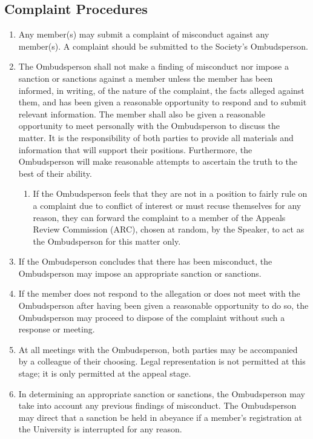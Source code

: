 \subsection{Complaint Procedures}
\begin{enumerate} [align=left]
\item Any member(s) may submit a complaint of misconduct against any member(s). A complaint should be submitted to the Society's Ombudsperson.
\item The Ombudsperson shall not make a finding of misconduct nor impose a sanction or sanctions against a member unless the member has been informed, in writing, of the nature of the complaint, the facts alleged against them, and has been given a reasonable opportunity to respond and to submit relevant information. The member shall also be given a reasonable opportunity to meet personally with the Ombudsperson to discuss the matter. It is the responsibility of both parties to provide all materials and information that will support their positions. Furthermore, the Ombudsperson will make reasonable attempts to ascertain the truth to the best of their ability.
\begin{enumerate} [label*=\arabic*., align=left]
\item If the Ombudsperson feels that they are not in a position to fairly rule on a complaint due to conflict of interest or must recuse themselves for any reason, they can forward the complaint to a member of the Appeals Review Commission (ARC), chosen at random, by the Speaker, to act as the Ombudsperson for this matter only.
\end{enumerate}
\item If the Ombudsperson concludes that there has been misconduct, the Ombudsperson may impose an appropriate sanction or sanctions.
\item If the member does not respond to the allegation or does not meet with the Ombudsperson after having been given a reasonable opportunity to do so, the Ombudsperson may proceed to dispose of the complaint without such a response or meeting.
\item At all meetings with the Ombudsperson, both parties may be accompanied by a colleague of their choosing. Legal representation is not permitted at this stage; it is only permitted at the appeal stage. \item In determining an appropriate sanction or sanctions, the Ombudsperson may take into account any previous findings of misconduct. The Ombudsperson may direct that a sanction be held in abeyance if a member's registration at the University is interrupted for any reason.

\end{enumerate}
